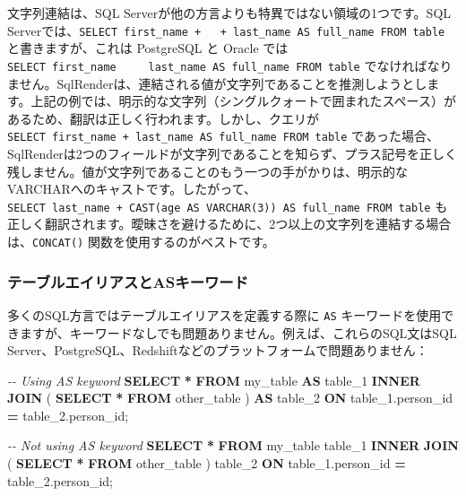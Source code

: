 \documentclass[
  11pt]{book}
\newenvironment{Shaded}{\begin{snugshade}}{\end{snugshade}}
\newcommand{\CommentTok}[1]{\textcolor[rgb]{0.56,0.35,0.01}{\textit{#1}}}
\newcommand{\KeywordTok}[1]{\textcolor[rgb]{0.13,0.29,0.53}{\textbf{#1}}}
\newcommand{\NormalTok}[1]{#1}
\newcommand{\OperatorTok}[1]{\textcolor[rgb]{0.81,0.36,0.00}{\textbf{#1}}}
\theoremstyle{definition}
\theoremstyle{definition}
\theoremstyle{definition}
\theoremstyle{definition}
\theoremstyle{remark}
\begin{document}
文字列連結は、SQL Serverが他の方言よりも特異ではない領域の1つです。SQL Serverでは、\texttt{SELECT\ first\_name\ +\ \textquotesingle{}\ \textquotesingle{}\ +\ last\_name\ AS\ full\_name\ FROM\ table} と書きますが、これは PostgreSQL と Oracle では \texttt{SELECT\ first\_name\ \textbar{}\textbar{}\ \textquotesingle{}\ \textquotesingle{}\ \textbar{}\textbar{}\ last\_name\ AS\ full\_name\ FROM\ table} でなければなりません。SqlRenderは、連結される値が文字列であることを推測しようとします。上記の例では、明示的な文字列（シングルクォートで囲まれたスペース）があるため、翻訳は正しく行われます。しかし、クエリが \texttt{SELECT\ first\_name\ +\ last\_name\ AS\ full\_name\ FROM\ table} であった場合、SqlRenderは2つのフィールドが文字列であることを知らず、プラス記号を正しく残しません。値が文字列であることのもう一つの手がかりは、明示的なVARCHARへのキャストです。したがって、\texttt{SELECT\ last\_name\ +\ CAST(age\ AS\ VARCHAR(3))\ AS\ full\_name\ FROM\ table} も正しく翻訳されます。曖昧さを避けるために、2つ以上の文字列を連結する場合は、\texttt{CONCAT()} 関数を使用するのがベストです。

\subsubsection*{テーブルエイリアスとASキーワード}\label{ux30c6ux30fcux30d6ux30ebux30a8ux30a4ux30eaux30a2ux30b9ux3068asux30adux30fcux30efux30fcux30c9}

多くのSQL方言ではテーブルエイリアスを定義する際に \texttt{AS} キーワードを使用できますが、キーワードなしでも問題ありません。例えば、これらのSQL文はSQL Server、PostgreSQL、Redshiftなどのプラットフォームで問題ありません：

\begin{Shaded}
\begin{Highlighting}[]
\CommentTok{{-}{-} Using AS keyword}
\KeywordTok{SELECT} \OperatorTok{*}
\KeywordTok{FROM}\NormalTok{ my\_table }\KeywordTok{AS}\NormalTok{ table\_1}
\KeywordTok{INNER} \KeywordTok{JOIN}\NormalTok{ (}
  \KeywordTok{SELECT} \OperatorTok{*} \KeywordTok{FROM}\NormalTok{ other\_table}
\NormalTok{) }\KeywordTok{AS}\NormalTok{ table\_2}
\KeywordTok{ON}\NormalTok{ table\_1.person\_id }\OperatorTok{=}\NormalTok{ table\_2.person\_id;}

\CommentTok{{-}{-} Not using AS keyword}
\KeywordTok{SELECT} \OperatorTok{*}
\KeywordTok{FROM}\NormalTok{ my\_table table\_1}
\KeywordTok{INNER} \KeywordTok{JOIN}\NormalTok{ (}
  \KeywordTok{SELECT} \OperatorTok{*} \KeywordTok{FROM}\NormalTok{ other\_table}
\NormalTok{) table\_2}
\KeywordTok{ON}\NormalTok{ table\_1.person\_id }\OperatorTok{=}\NormalTok{ table\_2.person\_id;}
\end{Highlighting}
\end{Shaded}
\end{document}
